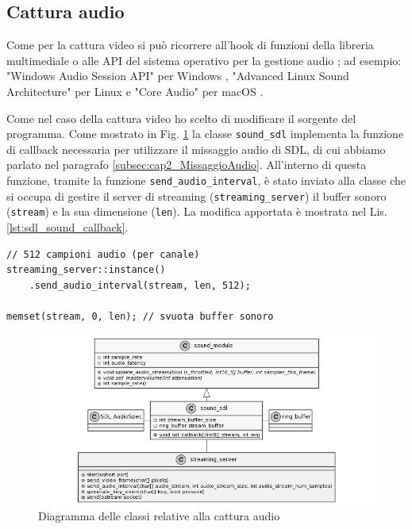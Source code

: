 \subsection{Cattura audio} \label{subsec:cap3_Audio}
Come per la cattura video si può ricorrere all'hook di funzioni della libreria multimediale o alle API del sistema operativo per la gestione audio \parencite{GamingAnywhere}; ad esempio: "Windows Audio Session API" per Windows \parencite{WASAPI}, "Advanced Linux Sound Architecture" per Linux \parencite{ALSA} e "Core Audio" per macOS \parencite{Core_Audio_api}.

Come nel caso della cattura video ho scelto di modificare il sorgente del programma. Come mostrato in Fig. \ref{fig:class_mixingSDL_streaming} la classe \verb|sound_sdl| implementa la funzione di callback necessaria per utilizzare il missaggio audio di SDL, di cui abbiamo parlato nel paragrafo \ref{subsec:cap2_MissaggioAudio}. All'interno di questa funzione, tramite la funzione \verb|send_audio_interval|, è stato inviato alla classe che si occupa di gestire il server di streaming (\verb|streaming_server|) il buffer sonoro (\verb|stream|) e la sua dimensione (\verb|len|). La modifica apportata è mostrata nel Lis. \ref{lst:sdl_sound_callback}.

\begin{lstlisting}[caption=Codice aggiunto per la cattura audio, label={lst:sdl_sound_callback}]
// 512 campioni audio (per canale)
streaming_server::instance()
	.send_audio_interval(stream, len, 512);

memset(stream, 0, len); // svuota buffer sonoro
\end{lstlisting}


\begin{figure}[H]
	\includegraphics[width=\linewidth]{immagini/class_mixingSDL_streaming}
	\caption{Diagramma delle classi relative alla cattura audio}
	\label{fig:class_mixingSDL_streaming}
\end{figure}



